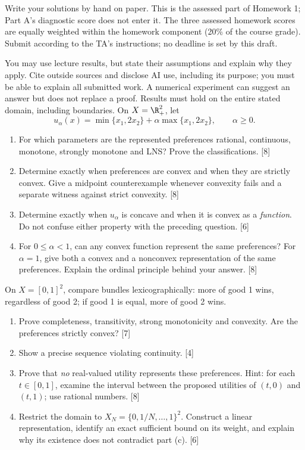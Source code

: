 Write your solutions by hand on paper. This is the assessed part of Homework 1; Part A's diagnostic score does not enter it. The three assessed homework scores are equally weighted within the homework component (20\% of the course grade). Submit according to the TA's instructions; no deadline is set by this draft.

You may use lecture results, but state their assumptions and explain why they apply. Cite outside sources and disclose AI use, including its purpose; you must be able to explain all submitted work. A numerical experiment can suggest an answer but does not replace a proof. Results must hold on the entire stated domain, including boundaries.
\conventions
{}
On $X=\R_+^2$, let
\[
 u_\alpha(x)=\min\{x_1,2x_2\}+\alpha\max\{x_1,2x_2\},\qquad \alpha\ge0.
\]
\begin{enumerate}[label=(\alph*)]
\item For which parameters are the represented preferences rational, continuous, monotone, strongly monotone and LNS? Prove the classifications. \hfill [8]
\item Determine exactly when preferences are convex and when they are strictly convex. Give a midpoint counterexample whenever convexity fails and a separate witness against strict convexity. \hfill [8]
\item Determine exactly when $u_\alpha$ is concave and when it is convex as a \emph{function}. Do not confuse either property with the preceding question. \hfill [6]
\item For $0\le\alpha<1$, can any convex function represent the same preferences? For $\alpha=1$, give both a convex and a nonconvex representation of the same preferences. Explain the ordinal principle behind your answer. \hfill [8]
\end{enumerate}
\clearpage
{}
On $X=[0,1]^2$, compare bundles lexicographically: more of good 1 wins, regardless of good 2; if good 1 is equal, more of good 2 wins.
\begin{enumerate}[label=(\alph*)]
\item Prove completeness, transitivity, strong monotonicity and convexity. Are the preferences strictly convex? \hfill [7]
\item Show a precise sequence violating continuity. \hfill [4]
\item Prove that \emph{no} real-valued utility represents these preferences. Hint: for each $t\in[0,1]$, examine the interval between the proposed utilities of $(t,0)$ and $(t,1)$; use rational numbers. \hfill [8]
\item Restrict the domain to $X_N=\{0,1/N,\ldots,1\}^2$. Construct a linear representation, identify an exact sufficient bound on its weight, and explain why its existence does not contradict part (c). \hfill [6]
\end{enumerate}

